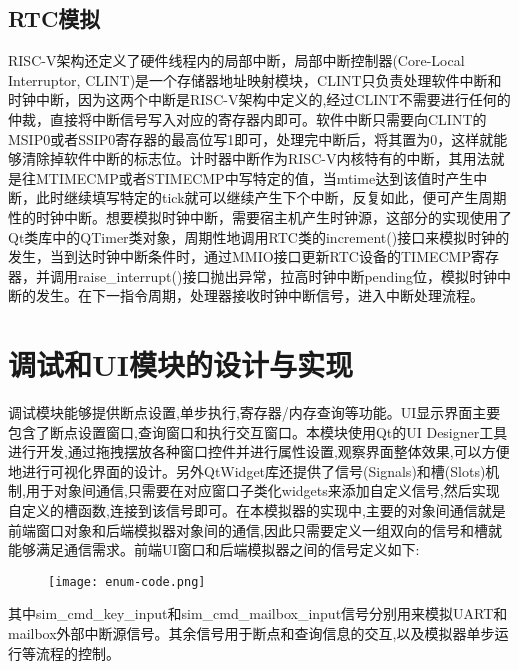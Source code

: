 \subsection{RTC模拟}

RISC-V架构还定义了硬件线程内的局部中断，局部中断控制器(Core-Local Interruptor, CLINT)是一个存储器地址映射模块，CLINT只负责处理软件中断和时钟中断，因为这两个中断是RISC-V架构中定义的,经过CLINT不需要进行任何的仲裁，直接将中断信号写入对应的寄存器内即可。软件中断只需要向CLINT的MSIP0或者SSIP0寄存器的最高位写1即可，处理完中断后，将其置为0，这样就能够清除掉软件中断的标志位。计时器中断作为RISC-V内核特有的中断，其用法就是往MTIMECMP或者STIMECMP中写特定的值，当mtime达到该值时产生中断，此时继续填写特定的tick就可以继续产生下个中断，反复如此，便可产生周期性的时钟中断。想要模拟时钟中断，需要宿主机产生时钟源，这部分的实现使用了Qt类库中的QTimer类对象，周期性地调用RTC类的increment()接口来模拟时钟的发生，当到达时钟中断条件时，通过MMIO接口更新RTC设备的TIMECMP寄存器，并调用raise\_interrupt()接口抛出异常，拉高时钟中断pending位，模拟时钟中断的发生。在下一指令周期，处理器接收时钟中断信号，进入中断处理流程。



\section{调试和UI模块的设计与实现}
调试模块能够提供断点设置,单步执行,寄存器/内存查询等功能。UI显示界面主要包含了断点设置窗口,查询窗口和执行交互窗口。本模块使用Qt的UI Designer工具进行开发,通过拖拽摆放各种窗口控件并进行属性设置,观察界面整体效果,可以方便地进行可视化界面的设计。另外QtWidget库还提供了信号(Signals)和槽(Slots)机制,用于对象间通信,只需要在对应窗口子类化widgets来添加自定义信号,然后实现自定义的槽函数,连接到该信号即可。在本模拟器的实现中,主要的对象间通信就是前端窗口对象和后端模拟器对象间的通信,因此只需要定义一组双向的信号和槽就能够满足通信需求。前端UI窗口和后端模拟器之间的信号定义如下:
\begin{figure}[H]
    \centering
    \texttt{[image: enum-code.png]}
    \label{fig:enum-code}
\end{figure}
\vspace{-0.8cm} 


其中sim\_cmd\_key\_input和sim\_cmd\_mailbox\_input信号分别用来模拟UART和mailbox外部中断源信号。其余信号用于断点和查询信息的交互,以及模拟器单步运行等流程的控制。



